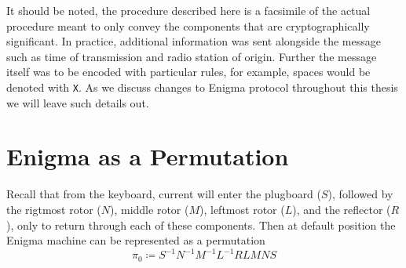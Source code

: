\noindent It should be noted, the procedure described here is a
facsimile of the actual procedure meant to only convey the components
that are cryptographically significant. In practice, additional
information was sent alongside the message such as time of
transmission and radio station of origin. Further the message itself
was to be encoded with particular rules, for example, spaces would be
denoted with \texttt{X}. As we discuss changes to Enigma protocol
throughout this thesis we will leave such details out.


\section{Enigma as a Permutation}

Recall that from the keyboard, current will enter the plugboard
($S$), followed by the rigtmost rotor ($N$), middle
rotor ($M$), leftmost rotor ($L$), and the reflector ($R$), only to
return through each of these components. Then at default position the
Enigma machine can be represented as a permutation
\[
  \pi_0 \coloneq S^{-1}N^{-1}M^{-1}L^{-1}RLMNS
\]

